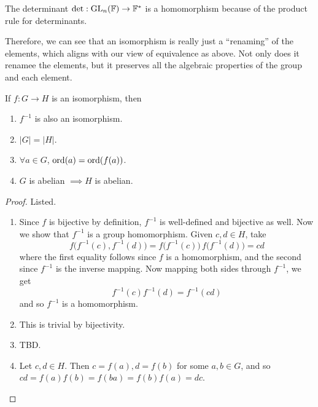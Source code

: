   \begin{example}[Determinant]
    The determinant $\det: \GL_n (\mathbb{F}) \rightarrow \mathbb{F}^\ast$ is a homomorphism because of the product rule for determinants. 
  \end{example}

  Therefore, we can see that an isomorphism is really just a ``renaming'' of the elements, which aligns with our view of equivalence as above. Not only does it renamee the elements, but it preserves all the algebraic properties of the group and each element. 

  \begin{theorem}
    If $f: G \rightarrow H$ is an isomorphism, then 
    \begin{enumerate}
      \item $f^{-1}$ is also an isomorphism. 
      \item $|G| = |H|$.
      \item $\forall a \in G$, $\ord(a) = \ord(f(a))$. 
      \item $G$ is abelian $\implies H$ is abelian. 
    \end{enumerate} 
  \end{theorem}
  \begin{proof}
    Listed. 
    \begin{enumerate}
      \item Since $f$ is bijective by definition, $f^{-1}$ is well-defined and bijective as well. Now we show that $f^{-1}$ is a group homomorphism. Given $c, d \in H$, take 
      \begin{equation}
        f \big( f^{-1} (c), f^{-1} (d)\big) = f \big( f^{-1} (c) \big) \, f \big( f^{-1} (d) \big) = cd 
      \end{equation}
      where the first equality follows since $f$ is a homomorphism, and the second since $f^{-1}$ is the inverse mapping. Now mapping both sides through $f^{-1}$, we get 
      \begin{equation}
        f^{-1} (c) f^{-1} (d) = f^{-1} (cd)
      \end{equation}
      and so $f^{-1}$ is a homomorphism. 

      \item This is trivial by bijectivity. 
      \item TBD. 
      \item Let $c, d \in H$. Then $c = f(a), d = f(b)$ for some $a, b \in G$, and so $cd = f(a) f(b) = f(ba) = f(b) f(a) = dc$. 
    \end{enumerate}
  \end{proof}

